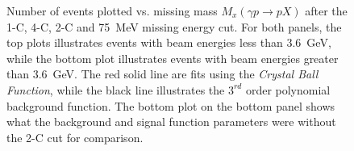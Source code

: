 \begin{figure}[h!]\begin{center}

\caption[Number of  events plotted vs. missing mass $M_x(\gamma p \to p X)$ after the 1-C, 4-C, 2-C and 75~MeV missing energy cut]{\label{kinefit.mm2pfinal.MC}Number of  events plotted vs. missing mass $M_x(\gamma p \to p X)$ after the 1-C, 4-C, 2-C and 75~MeV missing energy cut. For both panels, the top plots illustrates events with beam energies less than 3.6~GeV, while the bottom plot illustrates events with beam energies greater than 3.6~GeV. The red solid line are fits using the \emph{Crystal Ball Function}, while the black line illustrates the $3^{rd}$ order polynomial background function. The bottom plot on the bottom panel shows what the background and signal function parameters were without the 2-C cut for comparison.}

\end{center}\end{figure}

\FloatBarrier
